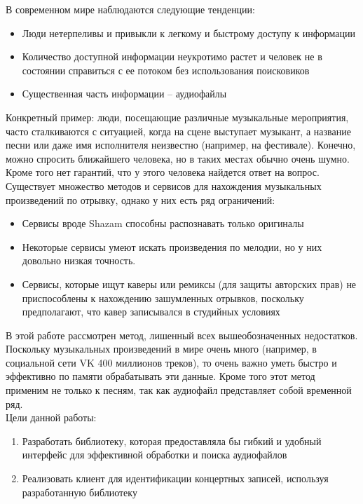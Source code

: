 \Introduction

В современном мире наблюдаются следующие тенденции:
\begin{itemize}
    \item Люди нетерпеливы и привыкли к легкому и быстрому доступу к информации
    \item Количество доступной информации неукротимо растет и человек не в состоянии
    справиться с ее потоком без использования поисковиков
    \item Существенная часть информации -- аудиофайлы
\end{itemize}

Конкретный пример: люди, посещающие различные музыкальные мероприятия, часто сталкиваются
с ситуацией, когда на сцене выступает музыкант, а название песни
или даже имя исполнителя неизвестно (например, на фестивале).
Конечно, можно спросить ближайшего человека, но в таких местах обычно очень шумно.
Кроме того нет гарантий, что у этого человека найдется ответ на вопрос.
Существует множество методов и сервисов для нахождения музыкальных произведений по отрывку,
однако у них есть ряд ограничений:
\begin{itemize}
    \item Сервисы вроде Shazam способны распознавать только оригиналы
    \item Некоторые сервисы умеют искать произведения по мелодии, но у них
            довольно низкая точность.
    \item Сервисы, которые ищут каверы или ремиксы (для защиты авторских прав) не приспособлены
            к нахождению зашумленных отрывков, поскольку предполагают, что кавер записывался в
            студийных условиях
\end{itemize}
В этой работе рассмотрен метод, лишенный всех вышеобозначенных недостатков.
Поскольку музыкальных произведений в мире очень много (например, в социальной сети VK 400 миллионов треков),
то очень важно уметь быстро и эффективно по памяти обрабатывать эти данные.
Кроме того этот метод применим не только к песням, так как аудиофайл представляет собой временной ряд.\\
Цели данной работы:
\begin{enumerate}[label=\arabic*.]
    \item Разработать библиотеку, которая предоставляла бы гибкий и удобный интерфейс
            для эффективной обработки и поиска аудиофайлов
    \item Реализовать клиент для идентификации концертных записей, используя разработанную
    библиотеку
\end{enumerate}
